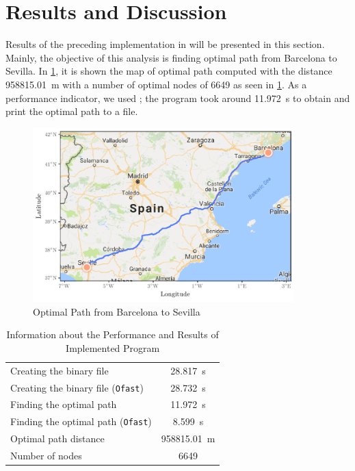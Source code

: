 \section{Results and Discussion}\label{sec:res}

Results of the preceding implementation in  will be presented in this section. Mainly, the objective of this analysis is finding optimal path from Barcelona to Sevilla. In \cref{fig:bcntosevilla}, it is shown the map of optimal path computed with the distance \SI{958815.01}{\m} with a number of optimal nodes of \num{6649} as seen in \cref{tab:results}. As a performance indicator, we used ; the program took around \SI{11.972}{\s} to obtain and print the optimal path to a  file. 
\begin{figure}[H]
    \centering
    \includegraphics[width=0.9\textwidth]{images/solution}
    \caption{Optimal Path from Barcelona to Sevilla}
    \label{fig:bcntosevilla}
\end{figure}

\begin{table}[H]
  \centering
  \begin{tabular}{l c}
      \toprule
      \toprule
      Creating the binary file                  & \SI{28.817}{\s} \\
      Creating the binary file (\texttt{Ofast}) & \SI{28.732}{\s} \\
      Finding the optimal path                  & \SI{11.972}{\s} \\
      Finding the optimal path (\texttt{Ofast}) & \SI{8.599}{\s}  \\
      \midrule
      Optimal path distance    & \SI{958815.01}{\m} \\
      Number of nodes          & \num{6649} \\
      \bottomrule
  \end{tabular}
  \caption{Information about the Performance and Results of Implemented Program}
  \label{tab:results}
\end{table}

